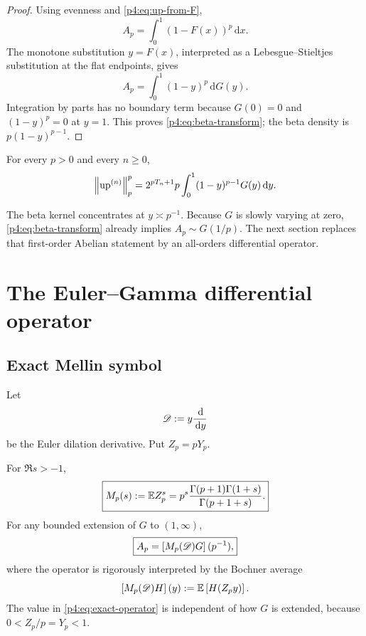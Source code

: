 \documentclass[11pt,oneside]{article}
\theoremstyle{definition}
\theoremstyle{remark}
\newcommand{\Up}{\operatorname{up}}
\newcommand{\dd}{\,\mathrm d}
\begin{document}
\begin{proof}
Using evenness and \eqref{p4:eq:up-from-F},
\[
 A_p=\int_0^1(1-F(x))^p\dd x.
\]
The monotone substitution $y=F(x)$, interpreted as a Lebesgue--Stieltjes substitution at the
flat endpoints, gives
\[
 A_p=\int_0^1(1-y)^p\dd G(y).
\]
Integration by parts has no boundary term because $G(0)=0$ and $(1-y)^p=0$ at $y=1$.
This proves \eqref{p4:eq:beta-transform}; the beta density is
$p(1-y)^{p-1}$.
\end{proof}

\begin{corollary}
For every $p>0$ and every $n\geq0$,
\begin{equation}
 \norm{\Up^{(n)}}_p^p
 =2^{pT_n+1}p\int_0^1(1-y)^{p-1}G(y)\dd y.
 \label{p4:eq:derivative-beta-transform}
\end{equation}
\end{corollary}

The beta kernel concentrates at $y\asymp p^{-1}$.  Because $G$ is slowly varying at zero,
\eqref{p4:eq:beta-transform} already implies $A_p\sim G(1/p)$.  The next section replaces that
first-order Abelian statement by an all-orders differential operator.

\section{The Euler--Gamma differential operator}
\label{p4:sec:gamma-operator}

\subsection{Exact Mellin symbol}

Let
\begin{equation}
 \Dop:=y\frac{\dd}{\dd y}
 \label{p4:eq:Euler-operator}
\end{equation}
be the Euler dilation derivative.  Put $Z_p=pY_p$.

\begin{proposition}
\label{p4:prop:Mellin-symbol}
For $\Re s>-1$,
\begin{equation}
 \boxed{
 M_p(s):=\mathbb E Z_p^s
 =p^s\frac{\Gamma(p+1)\Gamma(1+s)}{\Gamma(p+1+s)}.}
 \label{p4:eq:Mellin-symbol}
\end{equation}
For any bounded extension of $G$ to $(1,\infty)$,
\begin{equation}
 \boxed{
 A_p=\left[M_p(\mathscr D)G\right](p^{-1}),}
 \label{p4:eq:exact-operator}
\end{equation}
where the operator is rigorously interpreted by the Bochner average
\begin{equation}
 \left[M_p(\mathscr D)H\right](y)
 :=\mathbb E\left[H(Z_py)\right].
 \label{p4:eq:Bochner-dilation}
\end{equation}
The value in \eqref{p4:eq:exact-operator} is independent of how $G$ is extended, because
$0<Z_p/p=Y_p<1$.
\end{proposition}
\end{document}

